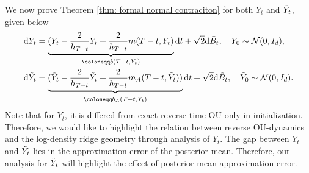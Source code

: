 \documentclass[11pt]{article}
\newcommand{\dee}{\mathrm{d}}
\newcommand{\mc}{\mathcal}
\begin{document}
We now prove Theorem \ref{thm: formal normal contraciton} for both $Y_t$ and $\Tilde{Y}_t$, given below
\begin{align*}
    \dee Y_t &= \underbrace{(Y_t - \frac{2}{h_{T-t}}Y_t + \frac{2}{h_{T-t}} m(T-t,Y_t)}_{\coloneqq b(T-t,Y_t)} \dee t +\sqrt{2} \dee \Bar{B}_t,  \quad Y_0\sim \mc{N}(0,I_d), \\
    \dee \Tilde{Y}_t &= \underbrace{(\Tilde{Y}_t -\frac{2}{h_{T-t}}\Tilde{Y}_t + \frac{2}{h_{T-t}} m_A(T-t,\Tilde{Y}_t))}_{\coloneqq b_A(T-t,\Tilde{Y}_t)} \dee t +\sqrt{2} \dee \Tilde{B}_t,  \quad \Tilde{Y}_0\sim \mc{N}(0,I_d).
\end{align*}
Note that for $Y_t$, it is differed from exact reverse-time OU only in initialization. Therefore, we would like to highlight the relation between reverse OU-dynamics and the log-density ridge geometry through analysis of $Y_t$. The gap between $Y_t$ and $\Tilde{Y}_t$ lies in the approximation error of the posterior mean. Therefore, our analysis for $\Tilde{Y}_t$ will highlight the effect of posterior mean approximation error.  
\end{document}

